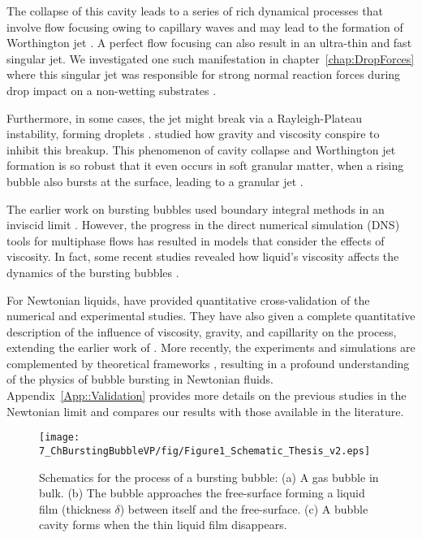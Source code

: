 The collapse of this cavity leads to a series of rich dynamical processes that involve flow focusing owing to capillary waves \citep{zeff2000singularity, duchemin2002jet} and may lead to the formation of Worthington jet \citep{gordillo2019capillary}. A perfect flow focusing can also result in an ultra-thin and fast singular jet. We investigated one such manifestation in chapter~\ref{chap:DropForces} where this singular jet was responsible for strong normal reaction forces during drop impact on a non-wetting substrates \citep[also see][]{bartolo2006singular, zhang2022impact}.

 Furthermore, in some cases, the jet might break via a Rayleigh-Plateau instability, forming droplets \citep{ghabache2014physics,ghabache2016size}. \citet{walls2015jet} studied how gravity and viscosity conspire to inhibit this breakup. This phenomenon of cavity collapse and Worthington jet formation is so robust that it even occurs in soft granular matter, when a rising bubble also bursts at the surface, leading to a granular jet \citep{lohse2004impact}.

The earlier work on bursting bubbles used boundary integral methods in an inviscid limit \citep{boulton1993gas,longuet1995critical}. However, the progress in the direct numerical simulation (DNS) tools for multiphase flows \citep{prosperetti2009computational, tryggvason2011direct, popinet2003gerris, popinet2009accurate} has resulted in models that consider the effects of viscosity. In fact, some recent studies revealed how liquid's viscosity affects the dynamics of the bursting bubbles \citep{deike2018dynamics, gordillo2019capillary}.

For Newtonian liquids, \citet{deike2018dynamics} have provided quantitative cross-validation of the numerical and experimental studies. They have also given a complete quantitative description of the influence of viscosity, gravity, and capillarity on the process, extending the earlier work of \citet{duchemin2002jet}. More recently, the experiments and simulations are complemented by theoretical frameworks  \citep{gordillo2019capillary, ganan2017revision}, resulting in a profound understanding of the physics of bubble bursting in Newtonian fluids. Appendix~\ref{App::Validation} provides more details on the previous studies in the Newtonian limit and compares our results with those available in the literature.

\begin{figure}
	\centering
	\texttt{[image: 7\_ChBurstingBubbleVP/fig/Figure1\_Schematic\_Thesis\_v2.eps]}	
	\caption{Schematics for the process of a bursting bubble: (a) A gas bubble in bulk. (b) The bubble approaches the free-surface forming a liquid film (thickness $\delta$) between itself and the free-surface. (c) A bubble cavity forms when the thin liquid film disappears.}
	\label{Ch7::fig:Schematic}
\end{figure}

